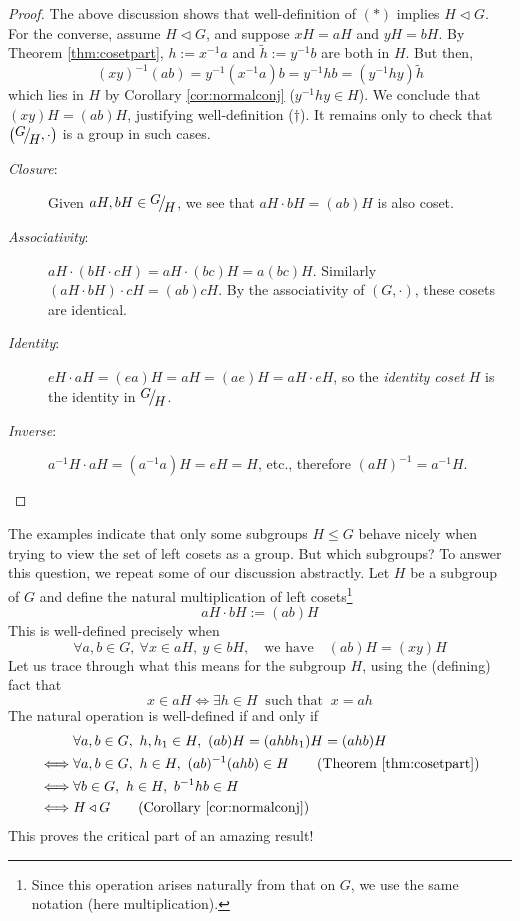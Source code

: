 \begin{proof}
	The above discussion shows that well-definition of $(\ast)$ implies $H\triangleleft G$.\smallbreak
	For the converse, assume $H\triangleleft G$, and suppose $xH=aH$ and $yH=bH$. By Theorem \ref{thm:cosetpart}, $h:=x^{-1}a$ and $\tilde h:=y^{-1}b$ are both in $H$. But then,
	\[
		(xy)^{-1}(ab)=y^{-1}(x^{-1}a)b =y^{-1}hb =(y^{-1}hy)\tilde h
	\]
	which lies in $H$ by Corollary \ref{cor:normalconj} ($y^{-1}hy\in H$). We conclude that $(xy)H=(ab)H$, justifying well-definition ($\dag$).\smallbreak	
	It remains only to check that $\left(\quotient GH,\cdot\right)$ is a group in such cases.
	\begin{description}
		\item[\normalfont\emph{Closure}:] Given $aH,bH\in\quotient GH$, we see that $aH\cdot bH=(ab)H$ is also coset.
		\item[\normalfont\emph{Associativity}:] $aH\cdot(bH\cdot cH)=aH\cdot(bc)H=a(bc)H$. Similarly $(aH\cdot bH)\cdot cH=(ab)cH$. By the associativity of $(G,\cdot)$, these cosets are identical.
		\item[\normalfont\emph{Identity}:] $eH\cdot aH=(ea)H=aH=(ae)H=aH\cdot eH$, so the \emph{identity coset} $H$ is the identity in $\quotient GH$.
		\item[\normalfont\emph{Inverse}:] $a^{-1}H\cdot aH=(a^{-1}a)H=eH=H$, etc., therefore $(aH)^{-1}=a^{-1}H$.\qedhere
	\end{description}
\end{proof}

\clearpage

\iffalse
The examples indicate that only some subgroups $H\le G$ behave nicely when trying to view the set of left cosets as a group. But which subgroups? To answer this question, we repeat some of our discussion abstractly. Let $H$ be a subgroup of $G$ and define the natural multiplication of left cosets\footnote{Since this operation arises naturally from that on $G$, we use the same notation (here multiplication).}
\[
	aH\cdot bH:=(ab)H
\]
This is well-defined precisely when
\[
	\forall a,b\in G,\ \forall x\in aH,\ y\in bH,
	\quad \text{we have}\quad 
	(ab)H=(xy)H
\]
Let us trace through what this means for the subgroup $H$, using the (defining) fact that 
\[
	x\in aH\iff \exists h\in H\ \text{ such that }\  x=ah
\]
The natural operation is well-defined if and only if
\begin{align*}
	&\forall a,b\in G,\ h,h_1\in H,\ (ab)H=(ahbh_1)H=(ah b)H\\
	\iff &\forall a,b\in G,\ h\in H,\ (ab)^{-1}(ah b)\in H \tag{Theorem \ref{thm:cosetpart}}\\
	\iff &\forall b\in G,\ h\in H,\ b^{-1}hb\in H\\
	\iff&H\triangleleft G \tag{Corollary \ref{cor:normalconj}}
\end{align*}
This proves the critical part of an amazing result!

